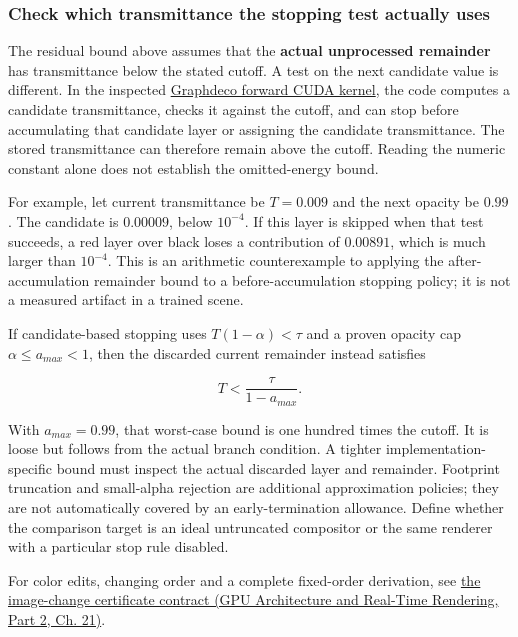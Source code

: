 \subsubsection{Check which transmittance the stopping test actually uses}\label{04-visual-computing-ii-ch041-check-which-transmittance-the-stopping-test-actually-uses}

\hypertarget{04-visual-computing-ii-ch041-check-which-transmittance-the-stopping-test-actually-uses}{}

The residual bound above assumes that the \textbf{actual unprocessed remainder} has transmittance below the stated cutoff. A test on the next candidate value is different. In the inspected \href{https://github.com/graphdeco-inria/diff-gaussian-rasterization/blob/main/cuda_rasterizer/forward.cu}{Graphdeco forward CUDA kernel}, the code computes a candidate transmittance, checks it against the cutoff, and can stop before accumulating that candidate layer or assigning the candidate transmittance. The stored transmittance can therefore remain above the cutoff. Reading the numeric constant alone does not establish the omitted-energy bound.

For example, let current transmittance be \(T=0.009\) and the next opacity be \(0.99\). The candidate is \(0.00009\), below \(10^{-4}\). If this layer is skipped when that test succeeds, a red layer over black loses a contribution of \(0.00891\), which is much larger than \(10^{-4}\). This is an arithmetic counterexample to applying the after-accumulation remainder bound to a before-accumulation stopping policy; it is not a measured artifact in a trained scene.

If candidate-based stopping uses \(T(1-\alpha)<\tau\) and a proven opacity cap \(\alpha\le a_{max}<1\), then the discarded current remainder instead satisfies

\[
T<\frac{\tau}{1-a_{max}}.
\]

With \(a_{max}=0.99\), that worst-case bound is one hundred times the cutoff. It is loose but follows from the actual branch condition. A tighter implementation-specific bound must inspect the actual discarded layer and remainder. Footprint truncation and small-alpha rejection are additional approximation policies; they are not automatically covered by an early-termination allowance. Define whether the comparison target is an ideal untruncated compositor or the same renderer with a particular stop rule disabled.

For color edits, changing order and a complete fixed-order derivation, see \href{../06-GPU-Architecture-and-Real-Time-Rendering-P02/main.pdf\#06-engine-ii-ch045-an-image-change-certificate-must-name-the-edits-it-covers}{the image-change certificate contract (GPU Architecture and Real-Time Rendering, Part 2, Ch. 21)}.

